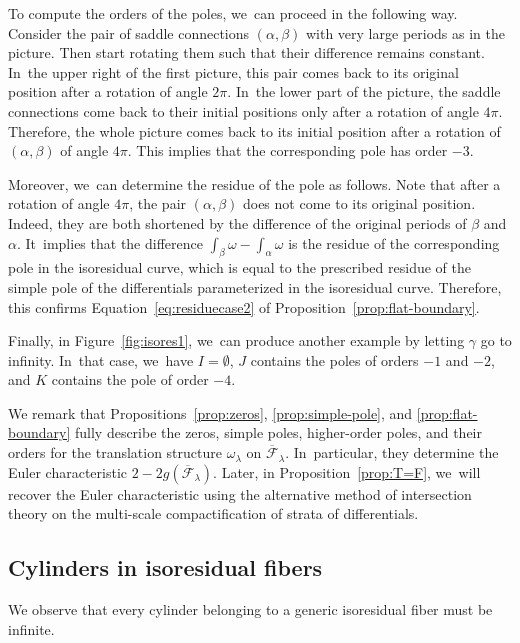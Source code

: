 \begin{ex}
To compute the orders of the poles, we~can proceed in the following way. Consider the pair of saddle connections $(\alpha,\beta)$ with very large periods as in the picture. Then start rotating them such that their difference remains constant. In~the upper right of the first picture, this pair comes back to its original position after a rotation of angle $2\pi$. In~the lower part of the picture, the saddle connections come back to their initial positions only after a rotation of angle $4\pi$. Therefore, the whole picture comes back to its initial position after a rotation of $(\alpha,\beta)$ of angle $4\pi$. This implies that the corresponding pole has order $-3$.

Moreover, we~can determine the residue of the pole as follows. Note that after a rotation of angle $4\pi$, the pair $(\alpha,\beta)$ does not come to its original position. Indeed, they are both shortened by the difference of the original periods of $\beta$ and $\alpha$. It~implies that the difference $\int_{\beta}\omega -\int_{\alpha}\omega$
is the residue of the corresponding pole in the isoresidual curve, which is equal to the prescribed residue of the simple pole of the differentials parameterized in the isoresidual curve. Therefore, this confirms Equation~\eqref{eq:residuecase2} of Proposition~\ref{prop:flat-boundary}.

Finally, in Figure~\ref{fig:isores1}, we~can produce another example by letting $\gamma$ go to infinity. In~that case, we~have $I=\emptyset$, $J$ contains the poles of orders $-1$ and $-2$, and $K$ contains the pole of order $-4$.
\end{ex}

We remark that Propositions~\ref{prop:zeros}, \ref{prop:simple-pole}, and \ref{prop:flat-boundary} fully describe the zeros, simple poles, higher-order poles, and their orders for the translation structure $\omega_\lambda$ on $\overline{\mathcal{F}}_{\lambda}$. In~particular, they determine the Euler characteristic $2-2g(\overline{\mathcal{F}}_{\lambda})$. Later, in Proposition~\ref{prop:T=F}, we~will recover the Euler characteristic using the alternative method of intersection theory on the multi-scale compactification of strata of differentials.

\subsection{Cylinders in isoresidual fibers}\label{sub:cylinders}

We observe that every cylinder belonging to a generic isoresidual fiber must be infinite.


